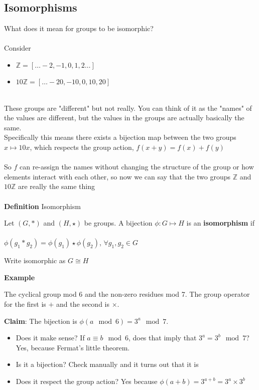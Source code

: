 \documentclass{article}
\begin{document}
\subsection{Isomorphisms}
What does it mean for groups to be isomorphic?
~\\
~\\
Consider 
\begin{itemize}
	\item $\mathbb{Z} = [\ldots -2,-1,0,1,2 \ldots]$ 
	\item $10\mathbb{Z}= [\ldots -20,-10,0,10,20]$	
\end{itemize}
~\\
These groups are "different" but not really. You can think of it as the "names" of the values are different, but the values in the groups are actually basically the same.
~\\
Specifically this means there exists a bijection map between the two groups $x \mapsto 10x$, which respects the group action, $f\left( x + y \right) = f\left( x \right) + f\left( y \right) $
~\\
~\\
So $f$ can re-assign the names without changing the structure of the group or how elements interact with each other, so now we can say that the two groups  $\mathbb{Z}$ and  $10\mathbb{Z}$ are really the same thing
~\\
~\\
\textbf{Definition}  Isomorphism 
\begin{framed}
	Let $\left( G,* \right) $ and $(H,\star)$ be groups. A bijection  $\phi:G\mapsto H$ is an \textbf{isomorphism} if \\ 
	~\\
	\indent $\phi\left(g_1 * g_2  \right) = \phi(g_1) \star \phi(g_2)$,  $\forall g_1,g_2 \in G$
\end{framed}
Write isomorphic as $G\cong H$

\textbf{Example}
\begin{framed}
	The cyclical group mod 6 and the non-zero residues mod 7. The group operator for the first is $+$ and the second is $\times$. 
	\begin{center}
		\textbf{Claim}: The bijection is $\phi(a \mod 6) = 3^a \mod 7$. 
        \end{center}
	\begin{itemize}
		\item Does it make sense? If $a \equiv b \mod 6$, does that imply that $3^a = 3^b \mod 7$? Yes, because Fermat's little theorem.
		\item Is it a bijection? Check manually and it turns out that it is
		\item Does it respect the group action? Yes because $\phi(a+b) = 3^{a+b} = 3^a \times 3^b$
	\end{itemize}
\end{framed}
\end{document}
